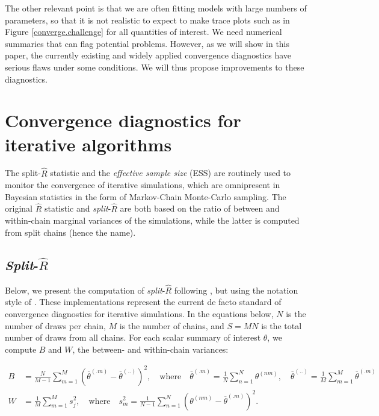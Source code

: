 \documentclass[american,]{article}
\begin{document}
The other relevant point is that we are often fitting models with large
numbers of parameters, so that it is not realistic to expect to make
trace plots such as in Figure \ref{converge.challenge} for all
quantities of interest. We need numerical summaries that can flag
potential problems. However, as we will show in this paper, the
currently existing and widely applied convergence diagnostics have
serious flaws under some conditions. We will thus propose improvements
to these diagnostics.

\hypertarget{CD}{%
\section{Convergence diagnostics for iterative algorithms}\label{CD}}

The split-\(\widehat{R}\) statistic and the \emph{effective sample size}
(ESS) are routinely used to monitor the convergence of iterative
simulations, which are omnipresent in Bayesian statistics in the form of
Markov-Chain Monte-Carlo sampling. The original \(\widehat{R}\) statistic
\citep{Gelman+Rubin:1992, Brooks+Gelman:1998} and
\emph{split}-\(\widehat{R}\) \citep{BDA3} are both based on the ratio of
between and within-chain marginal variances of the simulations, while
the latter is computed from split chains (hence the name).

\hypertarget{SplitRhat}{%
\subsection{\texorpdfstring{\emph{Split}-\(\widehat{R}\)}{Split-\textbackslash{}widehat\{R\}}}\label{SplitRhat}}

Below, we present the computation of \emph{split}-\(\widehat{R}\)
following \citet{BDA3}, but using the notation style of
\citet{StanBook}. These implementations represent the current de facto
standard of convergence diagnostics for iterative simulations. In the
equations below, \(N\) is the number of draws per chain, \(M\) is the
number of chains, and \(S=MN\) is the total number of draws from all
chains. For each scalar summary of interest \(\theta\), we compute \(B\)
and \(W\), the between- and within-chain variances:

\begin{align}
B &= \frac{N}{M-1}\sum_{m=1}^{M}(\overline{\theta}^{(.m)} - 
\overline{\theta}^{(..)})^2, \quad \mbox{where} \quad 
\overline{\theta}^{(.m)}=\frac{1}{N}\sum_{n=1}^N \theta^{(nm)}, \quad
\overline{\theta}^{(..)} = \frac{1}{M}\sum_{m=1}^M\overline{\theta}^{(.m)} 
\\
W &= \frac{1}{M}\sum_{m=1}^{M}s_j^2, \quad \mbox{where} \quad
s_m^2=\frac{1}{N-1} \sum_{n=1}^N (\theta^{(nm)}-\overline{\theta}^{(.m)})^2.
\end{align}
\end{document}
